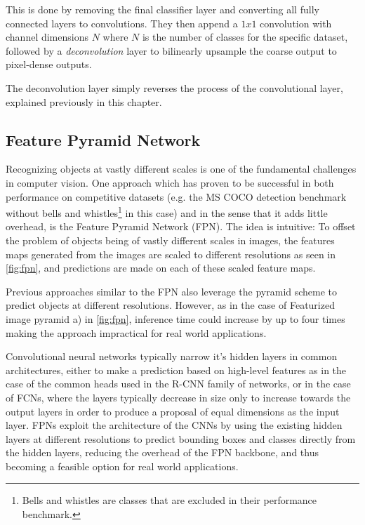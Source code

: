\documentclass[oneside, english, bibtex]{kththesis}
\begin{document}
This is done by removing the final classifier layer and converting all fully connected layers to convolutions. They then append a $ 1 x 1$ convolution with channel dimensions $N$ where $N$ is the number of classes for the specific dataset, followed by a \textit{deconvolution} layer to bilinearly upsample the coarse output to pixel-dense outputs.

The deconvolution layer simply reverses the process of the convolutional layer, explained previously in this chapter.

\subsection{Feature Pyramid Network}

Recognizing objects at vastly different scales is one of the fundamental challenges in computer vision. One approach which has proven to be successful in both performance on competitive datasets (e.g. the MS COCO detection benchmark without bells and whistles\footnote{Bells and whistles are classes that are excluded in their performance benchmark.} in this case) and in the sense that it adds little overhead, is the Feature Pyramid Network (FPN). The idea is intuitive: To offset the problem of objects being of vastly different scales in images, the features maps generated from the images are scaled to different resolutions as seen in \autoref{fig:fpn}, and predictions are made on each of these scaled feature maps.

Previous approaches similar to the FPN also leverage the pyramid scheme to predict objects at different resolutions. However, as in the case of Featurized image pyramid a) in \autoref{fig:fpn}, inference time could increase by up to four times making the approach impractical for real world applications.

Convolutional neural networks typically narrow it’s hidden layers in common architectures, either to make a prediction based on high-level features as in the case of the common heads used in the R-CNN family of networks, or in the case of FCNs, where the layers typically decrease in size only to increase towards the output layers in order to produce a proposal of equal dimensions as the input layer. FPNs exploit the architecture of the CNNs by using the existing hidden layers at different resolutions to predict bounding boxes and classes directly from the hidden layers, reducing the overhead of the FPN backbone, and thus becoming a feasible option for real world applications.
\end{document}
